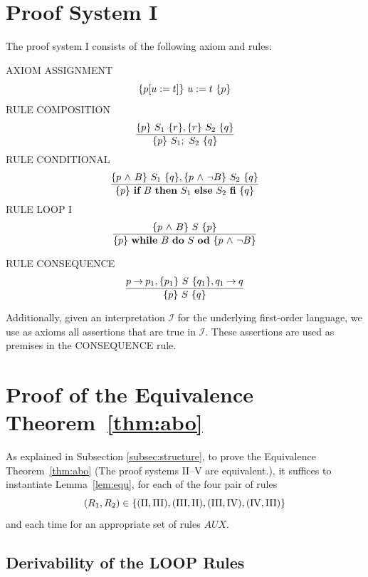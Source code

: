\documentclass[manuscript, screen, review]{acmart}
\newcommand{\AUX}{\mathit{AUX}}
\begin{document}
%

% 

%

\appendix

\section{Proof System I}
\label{sec:I}

The proof system I consists of the following axiom and rules:
\VV

\NI
AXIOM \label{rul:assi} ASSIGNMENT
\[ \mbox{$\{{p[u:=t]}\}\ {u:=t}\ \{{p}\}$} \]
%
\NI
RULE \label{rul:comp} COMPOSITION
\[ \frac{ \mbox{$\{{p}\}\ {S_1}\ \{{r}\}$}, \mbox{$\{{r}\}\ {S_2}\ \{{q}\}$}                }
        { \mbox{$\{{p}\}\ {S_1;\ S_2}\ \{{q}\}$}                          }\]
%
\NI
RULE \label{rul:cond} CONDITIONAL
\[ \frac{ \mbox{$\{{p \mbox{$\ \wedge\ $} B}\}\ {S_1}\ \{{q}\}$}, \mbox{$\{{p \mbox{$\ \wedge\ $} \neg B}\}\ {S_2}\ \{{q}\}$}         }
        { \mbox{$\{{p}\}\ {\mbox{$\mbox{{\bf if}\ } {B} \mbox{\ {\bf then}\ } {S_1} \mbox{\ {\bf else}\ } {S_2}\ \mbox{{\bf fi}}$}}\ \{{q}\}$}                          }\]
%
\NI
RULE \label{rul:loop} LOOP I
\[ \frac{ \mbox{$\{{p \mbox{$\ \wedge\ $} B}\}\ {S}\ \{{p}\}$}                             }
        { \mbox{$\{{p}\}\ {\mbox{$\mbox{{\bf while}\ } {B}\ \mbox{{\bf do}\ } {S}\ \mbox{{\bf od}}$}}\ \{{p \mbox{$\ \wedge\ $} \neg B}\}$}               }\]
%

\NI
RULE \label{rul:cons} CONSEQUENCE
\[ \frac{ p \mbox{$\:\rightarrow\:$} p_1, \mbox{$\{{p_1}\}\ {S}\ \{{q_1}\}$}, q_1 \mbox{$\:\rightarrow\:$} q        }
        { \mbox{$\{{p}\}\ {S}\ \{{q}\}$}                                  }\]
%

Additionally, given an interpretation $\mathcal{I}$ for the underlying first-order language, 
we use as axioms all assertions that are true in $\mathcal{I}$. 
These assertions are used as premises in the CONSEQUENCE rule. 



\section{Proof of the Equivalence Theorem~\ref{thm:abo}}
\label{sec:proof}

As explained in Subsection \ref{subsec:structure}, to prove the
Equivalence Theorem~\ref{thm:abo} (The proof systems II--V are equivalent.),
it suffices to instantiate Lemma~\ref{lem:equ}, 
for each of the four pair of rules
\[
  (R_1, R_2) \in \mbox{$\{{(\mathrm{II}, \mathrm{III}),
    (\mathrm{III},\mathrm{II}),
    (\mathrm{III}, \mathrm{IV}),
    (\mathrm{IV}, \mathrm{III})}\}$}
\]
and each time for an appropriate set of rules $\AUX$.


\subsection{Derivability of the LOOP Rules}
\label{subsec:proof-derivability}
\end{document}

